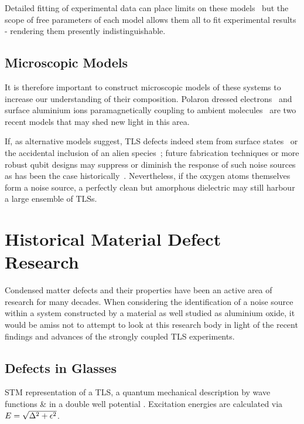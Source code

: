 Detailed fitting of experimental data can place limits on these models~\cite{Cole2010} but the scope of free parameters of each model allows them all to fit experimental results - rendering them presently indistinguishable.

\subsection{Microscopic Models}

It is therefore important to construct microscopic models of these systems to increase our understanding of their composition.
Polaron dressed electrons~\cite{Agarwal2013} and surface aluminium ions paramagnetically coupling to ambient molecules~\cite{Lee2014} are two recent models that may shed new light in this area.

If, as alternative models suggest, TLS defects indeed stem from surface states~\cite{Choi2009} or the accidental inclusion of an alien species~\cite{Jameson2011, Holder2013}; future fabrication techniques or more robust qubit designs may suppress or diminish the response of such noise sources as has been the case historically~\cite{Vion2002, Martinis2005, Koch2007, Schreier2008, Houck2008}.
Nevertheless, if the oxygen atoms themselves form a noise source, a perfectly clean but amorphous dielectric may still harbour a large ensemble of TLSs.

\section{Historical Material Defect Research}

Condensed matter defects and their properties have been an active area of research for many decades.
When considering the identification of a noise source within a system constructed by a material as well studied as aluminium oxide, it would be amiss not to attempt to look at this research body in light of the recent findings and advances of the strongly coupled TLS experiments.

\subsection{Defects in Glasses}
\begin{marginfigure}
\resizebox{\marginparwidth}{!}{}
\caption[STM Picture of a TLS]{STM representation of a TLS, a quantum mechanical description by wave functions  \&  in a double well potential . Excitation energies are calculated via $\cramped{E = \sqrt{\Delta^2+\epsilon^2}}$. }
\end{marginfigure}

